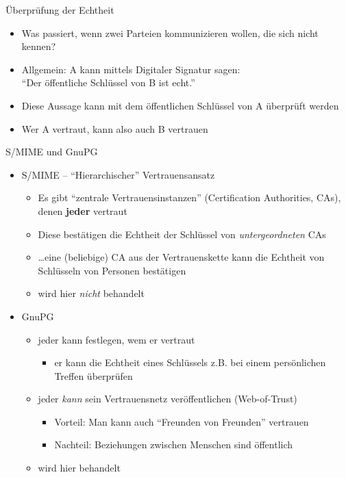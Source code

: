   \begin{frame}{Überprüfung der Echtheit}
\begin{itemize}
  \item Was passiert, wenn zwei Parteien kommunizieren wollen, die sich nicht kennen?\\[.5cm]
  \item Allgemein: A kann mittels Digitaler Signatur sagen:\\``Der öffentliche Schlüssel von B ist echt.''
  \item Diese Aussage kann mit dem öffentlichen Schlüssel von A überprüft werden
  \item Wer A vertraut, kann also auch B vertrauen
\end{itemize}
  \end{frame}

  \begin{frame}{S/MIME und GnuPG}
    \begin{itemize}
      \item S/MIME -- ``Hierarchischer'' Vertrauensansatz
      \begin{itemize}
        \item Es gibt ``zentrale Vertrauensinstanzen'' (Certification Authorities, CAs), denen \textbf{jeder} vertraut
        \item Diese bestätigen die Echtheit der Schlüssel von  \textit{untergeordneten} CAs
        \item \ldots eine (beliebige) CA aus der Vertrauenskette kann die Echtheit von Schlüsseln von Personen bestätigen
        \item wird hier \textit{nicht} behandelt
      \end{itemize}
      \item GnuPG
      \begin{itemize}
        \item jeder kann festlegen, wem er vertraut
        \begin{itemize}
          \item er kann die Echtheit eines Schlüssels z.B. bei einem persönlichen Treffen überprüfen
        \end{itemize}
        \item jeder \textit{kann} sein Vertrauensnetz veröffentlichen (Web-of-Trust)
        \begin{itemize}
          \item Vorteil: Man kann auch ``Freunden von Freunden'' vertrauen
          \item Nachteil: Beziehungen zwischen Menschen sind öffentlich 
        \end{itemize}
        \item wird hier behandelt
      \end{itemize}
    \end{itemize}
  \end{frame}

